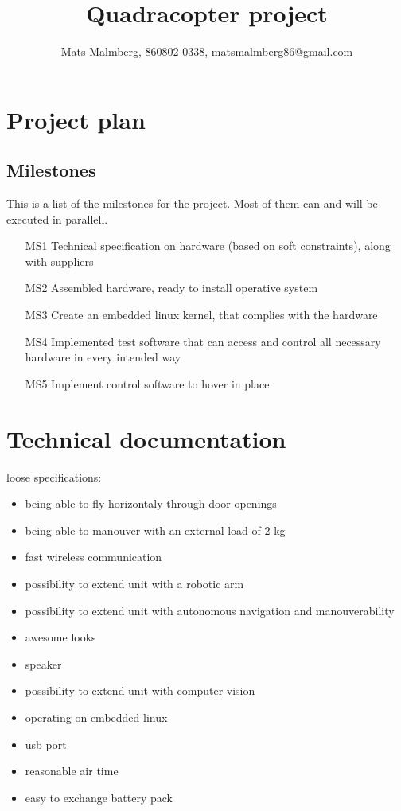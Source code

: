 \documentclass[12pt]{article}
\title{\center Quadracopter project}			%
\author{ Mats Malmberg, 860802-0338, matsmalmberg86@gmail.com}
\begin{document}
\maketitle			%

\section{Project plan}

\subsection{Milestones}
This is a list of the milestones for the project. Most of them can and will be executed in parallell.
\begin{itemize}
\item[MS1] Technical specification on hardware (based on soft constraints), along with suppliers
\item[MS2] Assembled hardware, ready to install operative system
\item[MS3] Create an embedded linux kernel, that complies with the hardware
\item[MS4] Implemented test software that can access and control all necessary hardware in every intended way
\item[MS5] Implement control software to hover in place
\end{itemize}

\section{Technical documentation}
loose specifications:\\
\begin{itemize}
\item being able to fly horizontaly through door openings
\item being able to manouver with an external load of 2 kg
\item fast wireless communication
\item possibility to extend unit with a robotic arm
\item possibility to extend unit with autonomous navigation and manouverability
\item awesome looks
\item speaker
\item possibility to extend unit with computer vision
\item operating on embedded linux
\item usb port
\item reasonable air time
\item easy to exchange battery pack
\end{itemize}
\end{document}

